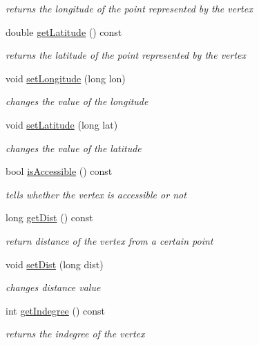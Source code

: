 \begin{DoxyCompactItemize}
\begin{DoxyCompactList}\small\item\em returns the longitude of the point represented by the vertex \end{DoxyCompactList}\item 
double \hyperlink{class_vertex_a7455a09de51b274867edae2254cef38d}{get\+Latitude} () const
\begin{DoxyCompactList}\small\item\em returns the latitude of the point represented by the vertex \end{DoxyCompactList}\item 
void \hyperlink{class_vertex_a7d0a5b733d2989ff210731130d59ea01}{set\+Longitude} (long lon)
\begin{DoxyCompactList}\small\item\em changes the value of the longitude \end{DoxyCompactList}\item 
void \hyperlink{class_vertex_ab64d264d0cee87b14859d2a9df071403}{set\+Latitude} (long lat)
\begin{DoxyCompactList}\small\item\em changes the value of the latitude \end{DoxyCompactList}\item 
bool \hyperlink{class_vertex_ac6febe9ce4ec00dcd59710e1b0fba407}{is\+Accessible} () const
\begin{DoxyCompactList}\small\item\em tells whether the vertex is accessible or not \end{DoxyCompactList}\item 
long \hyperlink{class_vertex_a7f1702326d1d54ea68897d27e68fd1ff}{get\+Dist} () const
\begin{DoxyCompactList}\small\item\em return distance of the vertex from a certain point \end{DoxyCompactList}\item 
void \hyperlink{class_vertex_a5c2c39cab1350900bbeb42cfa99b70d2}{set\+Dist} (long dist)
\begin{DoxyCompactList}\small\item\em changes distance value \end{DoxyCompactList}\item 
int \hyperlink{class_vertex_afd1d78d4b08162c2c470db5c7b1386f6}{get\+Indegree} () const
\begin{DoxyCompactList}\small\item\em returns the indegree of the vertex \end{DoxyCompactList}\item 

\end{DoxyCompactItemize}
